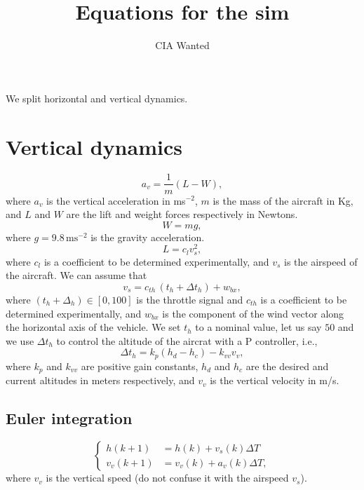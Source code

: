 \documentclass[11pt,a4paper,titlepage]{article}
\title{Equations for the sim}
\author{CIA Wanted}
\begin{document}
\maketitle
We split horizontal and vertical dynamics.

\section{Vertical dynamics}
\begin{equation}
	a_v = \frac{1}{m} (L - W),
\end{equation}
where $a_v$ is the vertical acceleration in ms$^{-2}$, $m$ is the mass of the aircraft in Kg, and $L$ and $W$ are the lift and weight forces respectively in Newtons.
\begin{equation}
W = mg,
\end{equation}
where $g = 9.8 \, \text{ms}^{-2}$ is the gravity acceleration.
\begin{equation}
L = c_l v_s^2,
\end{equation}
where $c_l$ is a coefficient to be determined experimentally, and $v_s$ is the airspeed of the aircraft. We can assume that
\begin{equation}
	v_s = c_{th}\, (t_h + \Delta t_h) + w_{bx},
\end{equation}
where $(t_h + \Delta_h) \in [0,100]$ is the throttle signal and $c_{th}$ is a coefficient to be determined experimentally, and $w_{bx}$ is the component of the wind vector along the horizontal axis of the vehicle. We set $t_h$ to a nominal value, let us say $50$ and we use $\Delta t_h$ to control the altitude of the aircrat with a P controller, i.e., 
\begin{equation}
	\Delta t_h = k_p (h_d - h_c) - k_{vv} v_v,
\end{equation}
where $k_p$ and $k_{vv}$ are positive gain constants, $h_d$ and $h_c$ are the desired and current altitudes in meters respectively, and $v_v$ is the vertical velocity in m/s.

\subsection{Euler integration}
\begin{equation}
	\begin{cases}
		h(k+1) &= h(k) + v_s(k) \Delta T \\
		v_v(k+1) &= v_v(k) + a_v(k) \Delta T,
	\end{cases}
\end{equation}
where $v_v$ is the vertical speed (do not confuse it with the airspeed $v_s$).
\end{document}
